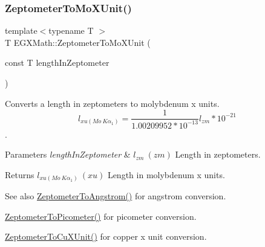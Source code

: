 \subsubsection{\texorpdfstring{Zeptometer\+To\+Mo\+X\+Unit()}{ZeptometerToMoXUnit()}}
{\footnotesize\ttfamily template$<$typename T $>$ \\
T E\+G\+X\+Math\+::\+Zeptometer\+To\+Mo\+X\+Unit (\begin{DoxyParamCaption}\item[{const T}]{length\+In\+Zeptometer }\end{DoxyParamCaption})}



Converts a length in zeptometers to molybdenum x units. \[ l_{xu(Mo\ K\alpha_1)}=\frac{1}{1.00209952*10^{-13}} l_{zm} * 10^{-21}\]. 


\begin{DoxyParams}{Parameters}
{\em length\+In\+Zeptometer} & $ l_{zm}\ (zm)$ Length in zeptometers. \\
\hline
\end{DoxyParams}
\begin{DoxyReturn}{Returns}
$ l_{xu(Mo\ K\alpha_1)}\ (xu)$ Length in molybdenum x units. 
\end{DoxyReturn}
\begin{DoxySeeAlso}{See also}
\mbox{\hyperlink{group___e_g_x_math-_conversions-_length_conversions-_s_i-_zeptometer-_non-_s_i_gaa7023afd2a269dddf741cb4299803ef2}{Zeptometer\+To\+Angstrom()}} for angstrom conversion. 

\mbox{\hyperlink{group___e_g_x_math-_conversions-_length_conversions-_s_i-_zeptometer-_s_i_gae7409493227692a85b7fa5016a007de3}{Zeptometer\+To\+Picometer()}} for picometer conversion. 

\mbox{\hyperlink{group___e_g_x_math-_conversions-_length_conversions-_s_i-_zeptometer-_non-_s_i_gaeeff3d1ea7d8cd0c703419ce16fcadd7}{Zeptometer\+To\+Cu\+X\+Unit()}} for copper x unit conversion. 
\end{DoxySeeAlso}
